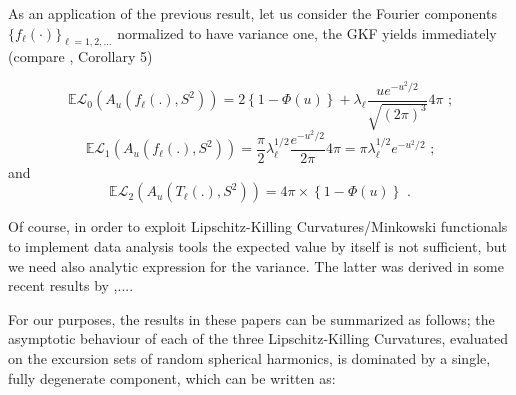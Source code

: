 \documentclass[aps,prd,showpacs,superscriptaddress,groupedaddress]{revtex4-1}  %
\begin{document}
As an application of the previous result, let us consider the Fourier components $\{f_\ell(\cdot)\}_{\ell=1,2,\dots}$ normalized to have variance one, the GKF yields immediately (compare
\cite{MarVad}, Corollary 5)%

\begin{equation}
\mathbb{E}\mathcal{L}_{0}(A_{u}(f_{\ell }(.),S^{2}))=2\left\{ 1-\Phi
(u)\right\} +\lambda_{\ell}\frac{ue^{-u^{2}/2}}{\sqrt{(2\pi )^{3}}}%
4\pi \text{ ;}  \label{sh1}
\end{equation}
\begin{equation}
\mathbb{E}\mathcal{L}_{1}(A_{u}(f_{\ell }(.),S^{2})) =\frac{\pi }{2}%
\lambda_{\ell}^{1/2}\frac{e^{-u^{2}/2}}{2\pi }%
4\pi=\pi \lambda_{\ell}^{1/2}e^{-u^{2}/2}\text{ ;} \label{sh2}
\end{equation}
and%
\begin{equation}
\mathbb{E}\mathcal{L}_{2}(A_{u}(T_{\ell }(.),S^{2}))=4\pi \times \left\{
1-\Phi (u)\right\} \text{ .}  \label{sh3}
\end{equation}

Of course, in order to exploit Lipschitz-Killing Curvatures/Minkowski functionals to implement data analysis tools the expected value by itself is not sufficient, but we need also analytic expression for the variance. The latter was derived in some recent results by \cite{CMW-EPC},....

For our purposes, the results in these papers can be summarized as follows; the asymptotic behaviour of each of the three Lipschitz-Killing Curvatures, evaluated on the excursion sets of random spherical harmonics, is dominated by a single, fully degenerate component, which can be written as:
\end{document}
